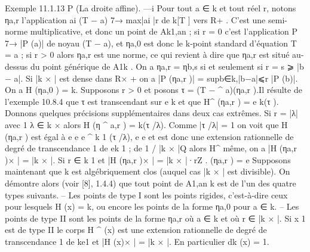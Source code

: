 \documentclass[
  10pt,
]{article}
\newenvironment{Shaded}{}{}
\newcommand{\NormalTok}[1]{#1}
\begin{document}
\begin{Shaded}
\begin{Highlighting}[]
\NormalTok{Exemple 11.1.13      P (La droite affine). —i Pour tout a ∈ k et tout réel r, notons}
\NormalTok{ηa,r l’application      ai (T − a) 7→ max|ai |r de k[T ] vers R+ . C’est une semi{-}norme}
\NormalTok{multiplicative, et donc un point de Ak1,an ; si r = 0 c’est l’application P 7→ |P (a)| de}
\NormalTok{noyau (T − a), et ηa,0 est donc le k{-}point standard d’équation T = a ; si r \textgreater{} 0 alors ηa,r}
\NormalTok{est une norme, ce qui revient à dire que ηa,r est situé au{-}dessus du point générique de}
\NormalTok{A1k . On a ηa,r = ηb,s si et seulement si r = s ⩾ |b − a|. Si |k × | est dense dans R×  + on a}
\NormalTok{|P (ηa,r )| = supb∈k,|b−a|⩽r |P (b)|.}
\NormalTok{   On a H (ηa,0 ) = k. Supposons r \textgreater{} 0 et posons τ = (T −  \^{} a)(ηa,r ).Il résulte de l’exemple}
\NormalTok{10.8.4 que τ est transcendant sur e k et que H\^{}}
\NormalTok{                                              (ηa,r ) = e}
\NormalTok{                                                        k(τ ).}
\NormalTok{    Donnons quelques précisions supplémentaires dans deux cas extrêmes. Si r = |λ| avec}
\NormalTok{                                                                           1}
\NormalTok{λ ∈ k × alors H (η}
\NormalTok{                 \^{}  a,r ) = k(τ /λ). Comme |τ /λ| = 1 on voit que H (ηa,r ) est égal à}
\NormalTok{                            e e                e                    \^{}}
\NormalTok{k 1 (τ /λ),}
\NormalTok{e       e et est donc une extension rationnelle de degré de transcendance 1 de ek 1 ; de}
\NormalTok{                                                                 1}
\NormalTok{                                        / |k × |Q alors H\^{}}
\NormalTok{même, on a |H (ηa,r )× | = |k × |. Si r ∈                          k 1 et |H (ηa,r )× | = |k × |·rZ .}
\NormalTok{                                                         (ηa,r ) = e}
\NormalTok{  Supposons maintenant que k est algébriquement clos (auquel cas |k × | est divisible).}
\NormalTok{On démontre alors (voir [8], 1.4.4) que tout point de A1,an    k  est de l’un des quatre types}
\NormalTok{suivants.}
\NormalTok{   – Les points de type I sont les points rigides, c’est{-}à{-}dire ceux pour lesquels H (x) = k,}
\NormalTok{ou encore les points de la forme ηa,0 pour a ∈ k.}
\NormalTok{   – Les points de type II sont les points de la forme ηa,r où a ∈ k et où r ∈ |k × |. Si x}
\NormalTok{                                1}
\NormalTok{est de type II le corps H \^{}  (x) est une extension rationnelle de degré de transcendance 1}
\NormalTok{de ke1 et |H (x)× | = |k × |. En particulier dk (x) = 1.}

\end{Highlighting}
\end{Shaded}
\end{document}
